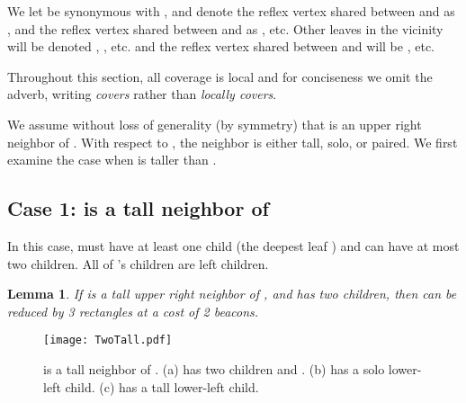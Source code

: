 \documentclass{article}
\newtheorem{lemma}{Lemma}
\begin{document}
	We let  be synonymous with , and denote the reflex vertex shared between
	 and  as , and the reflex vertex shared between
	 and  as , etc.  
	Other leaves in the vicinity will be denoted , , etc.
	and the reflex vertex shared between  and  will be , etc.
			
	Throughout this section, all coverage is local and for conciseness we omit the
	adverb, writing \emph{covers} rather than \emph{locally covers}. 
	
	We assume without loss of generality (by symmetry)
	that  is an upper right neighbor of .  
	With respect to , the neighbor  is either tall, solo, or paired.
	We first examine the case when  is taller than .

	\subsection{Case 1:  is a tall neighbor of }\label{sec:atwotall}
	
		In this case,  must have at least one child (the deepest leaf ) and can
		have at most two children.  All of 's children are left children.

		\begin{lemma}\label{lem:twotalltwokids}
			If  is a tall upper right neighbor of , 
			and  has two children,
			then  can be reduced
			by 3 rectangles at a cost of 2 beacons.
		\end{lemma}
		
		\begin{figure}[htbp] 
			\begin{center}
				\texttt{[image: TwoTall.pdf]} 
			\end{center}
			\caption{
				 is a tall neighbor of .
				(a)  has two children  and . 
				(b)  has a solo lower-left child. 
				(c)  has a tall lower-left child.
			}
			\label{fig:twotall}
		\end{figure}
		
\end{document}

